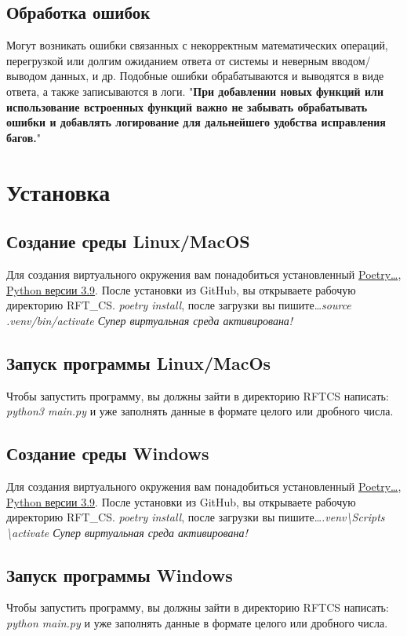 \documentclass[a4paper, 12pt]{report}
\begin{document}
\section{Обработка ошибок}
\textrm{
    Могут возникать ошибки связанных с некорректным математических операций, перегрузкой или долгим ожиданием ответа от системы и неверным вводом/выводом данных, и др. Подобные ошибки обрабатываются и выводятся в виде ответа, а также записываются в логи. "{\bfseries При добавлении новых функций или использование встроенных функций важно не забывать обрабатывать ошибки и добавлять логирование для дальнейшего удобства исправления багов.}"
}
\clearpage
\chapter{Установка}
\section{Создание среды Linux/MacOS}
\textrm{
    Для создания виртуального окружения вам понадобиться установленный \href{https://python-poetry.org/}{Poetry\ldots}, \href{https://docs.python.org/3.9/}{Python версии 3.9}. После установки из GitHub, вы открываете рабочую директорию RFT\_CS. {\slshape poetry install}, после загрузки вы пишите\ldots {\slshape source .venv/bin/activate \Upsilon Супер виртуальная среда активирована!}\\
}
\section{Запуск программы Linux/MacOs}
\textrm{
    Чтобы запустить программу, вы должны зайти в директорию RFTCS \Rightarrow написать: {\slshape python3 main.py} и уже заполнять данные в формате целого или дробного числа.
}
\section{Создание среды Windows}
\textrm{
    Для создания виртуального окружения вам понадобиться установленный \href{https://python-poetry.org/}{Poetry\ldots}, \href{https://docs.python.org/3.9/}{Python версии 3.9}. После установки из GitHub, вы открываете рабочую директорию RFT\_CS. {\slshape poetry install}, после загрузки вы пишите\ldots {\slshape .venv\textbackslash Scripts \textbackslash activate \Upsilon Супер виртуальная среда активирована!}
}\\
\section{Запуск программы Windows}
\textrm {
    Чтобы запустить программу, вы должны зайти в директорию RFTCS написать: {\slshape python main.py} и уже заполнять данные в формате целого или дробного числа.
}
\end{document}

